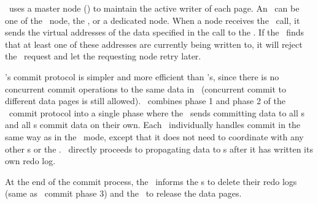 \hotpot\ uses a master node ({\em \master}) to maintain the active writer of each page. 
An \master\ can be one of the \hotpot\ node, the \cd, or a dedicated node.
When a node receives the \acquire\ call, it sends the virtual addresses of the data specified in the call to the \master.
If the \master\ finds that at least one of these addresses are currently being written to, 
it will reject the \acquire\ request and let the requesting node retry later.

\mrsw's commit protocol is simpler and more efficient than \mrmw's,
since there is no concurrent commit operations to the same data in \mrsw\ (concurrent commit to different data pages is still allowed).
\mrsw\ combines phase 1 and phase 2 of the \mrmw\ commit protocol into a single phase 
where the \xn\ sends committing data to all \on{}s and all \on{}s commit data on their own.
Each \on\ individually handles commit in the same way as in the \mrmw\ mode, 
except that it does not need to coordinate with any other \on{}s or the \xn. 
\on\ directly proceeds to propagating data to \dn{}s after it has written its own redo log.

At the end of the commit process, the \xn\ informs the \on{}s to delete their redo logs (same as \mrmw\ commit phase 3)
and the \master\ to release the data pages.


